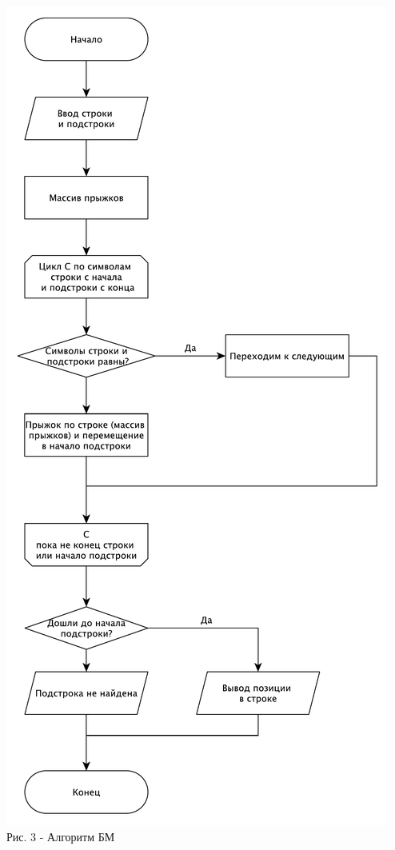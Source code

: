\documentclass[a4paper,14pt]{article} %
\begin{document}
	\begin{center}
        		\includegraphics[scale = 0.57]{shema2} \\ Рис. 3 - Алгоритм БМ
	\end{center}
        	
\end{document}
